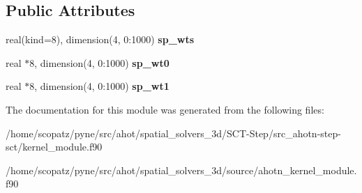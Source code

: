 \subsection*{Public Attributes}
\begin{DoxyCompactItemize}
\item 
\hypertarget{classkernel__module_ad2a8647b9f46d5c36966764ba8084d64}{real(kind=8), dimension(4, 0\-:1000) {\bfseries sp\-\_\-wts}}\label{classkernel__module_ad2a8647b9f46d5c36966764ba8084d64}

\item 
\hypertarget{classkernel__module_a56176b696afbc435b81f6c7ebd75f287}{real $\ast$8, dimension(4, 0\-:1000) {\bfseries sp\-\_\-wt0}}\label{classkernel__module_a56176b696afbc435b81f6c7ebd75f287}

\item 
\hypertarget{classkernel__module_a9c85ae778290368b8125e6548542c20c}{real $\ast$8, dimension(4, 0\-:1000) {\bfseries sp\-\_\-wt1}}\label{classkernel__module_a9c85ae778290368b8125e6548542c20c}

\end{DoxyCompactItemize}


The documentation for this module was generated from the following files\-:\begin{DoxyCompactItemize}
\item 
/home/scopatz/pyne/src/ahot/spatial\-\_\-solvers\-\_\-3d/\-S\-C\-T-\/\-Step/src\-\_\-ahotn-\/step-\/sct/kernel\-\_\-module.\-f90\item 
/home/scopatz/pyne/src/ahot/spatial\-\_\-solvers\-\_\-3d/source/ahotn\-\_\-kernel\-\_\-module.\-f90\end{DoxyCompactItemize}

